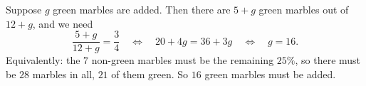 Suppose $g$ green marbles are added. Then there are $5+g$ green marbles out of $12+g$, and we need
\[
\dfrac{5+g}{12+g}=\dfrac{3}{4}\quad\Longleftrightarrow\quad 20+4g=36+3g\quad\Longleftrightarrow\quad g=16 .
\]
Equivalently: the $7$ non-green marbles must be the remaining $25\%$, so there must be $28$ marbles in all, $21$ of them green. So $\boxed{16}$ green marbles must be added.
